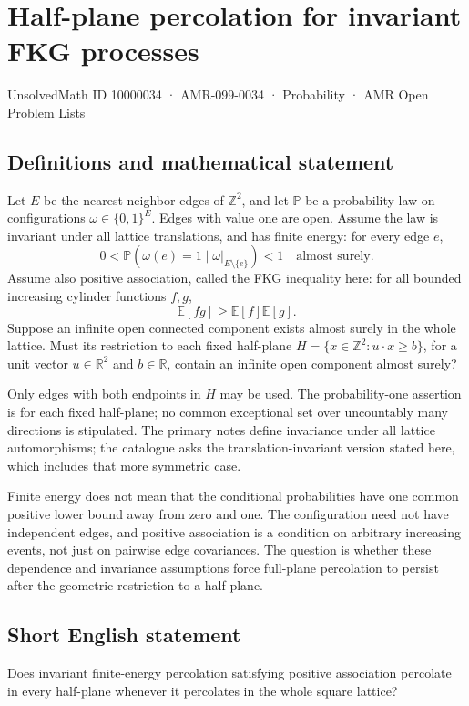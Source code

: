 \documentclass[11pt,a4paper]{article}
\begin{document}
\section*{Half-plane percolation for invariant FKG processes}\label{10000034}
{\small UnsolvedMath ID 10000034 · AMR-099-0034 · Probability · AMR Open Problem Lists}
\subsection{Definitions and mathematical statement}
Let $E$ be the nearest-neighbor edges of $\mathbb Z^2$, and let $\mathbb P$ be a probability law on configurations $\omega\in\{0,1\}^E$. Edges with value one are open. Assume the law is invariant under all lattice translations, and has finite energy: for every edge $e$,
\[
0<\mathbb P(\omega(e)=1\mid\omega|_{E\setminus\{e\}})<1
\quad\text{almost surely}.
\]
Assume also positive association, called the FKG inequality here: for all bounded increasing cylinder functions $f,g$,
\[
\mathbb E[fg]\ge\mathbb E[f]\mathbb E[g].
\]
Suppose an infinite open connected component exists almost surely in the whole lattice. Must its restriction to each fixed half-plane $H=\{x\in\mathbb Z^2:u\cdot x\ge b\}$, for a unit vector $u\in\mathbb R^2$ and $b\in\mathbb R$, contain an infinite open component almost surely?

Only edges with both endpoints in $H$ may be used. The probability-one assertion is for each fixed half-plane; no common exceptional set over uncountably many directions is stipulated. The primary notes define invariance under all lattice automorphisms; the catalogue asks the translation-invariant version stated here, which includes that more symmetric case.

Finite energy does not mean that the conditional probabilities have one common positive lower bound away from zero and one. The configuration need not have independent edges, and positive association is a condition on arbitrary increasing events, not just on pairwise edge covariances. The question is whether these dependence and invariance assumptions force full-plane percolation to persist after the geometric restriction to a half-plane.
\subsection{Short English statement}
Does invariant finite-energy percolation satisfying positive association percolate in every half-plane whenever it percolates in the whole square lattice?
\end{document}
